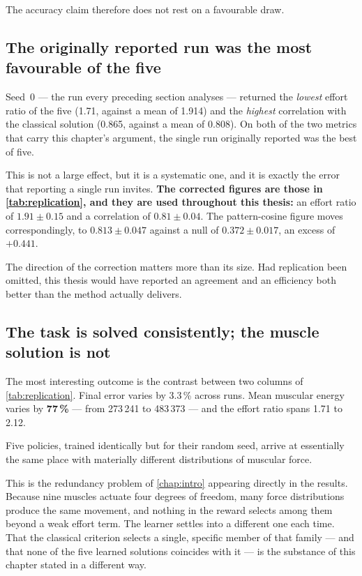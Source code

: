 The accuracy claim therefore does not rest on a favourable draw.

\subsection{The originally reported run was the most favourable of the five}

Seed~0 --- the run every preceding section analyses --- returned the
\emph{lowest} effort ratio of the five (1.71, against a mean of 1.914) and the
\emph{highest} correlation with the classical solution (0.865, against a mean of
0.808). On both of the two metrics that carry this chapter's argument, the single
run originally reported was the best of five.

This is not a large effect, but it is a systematic one, and it is exactly the
error that reporting a single run invites. \textbf{The corrected figures are
those in \cref{tab:replication}, and they are used throughout this thesis:} an
effort ratio of $1.91 \pm 0.15$ and a correlation of $0.81 \pm 0.04$. The
pattern-cosine figure moves correspondingly, to $0.813 \pm 0.047$ against a null
of $0.372 \pm 0.017$, an excess of $+0.441$.

The direction of the correction matters more than its size. Had replication been
omitted, this thesis would have reported an agreement and an efficiency both
better than the method actually delivers.

\subsection{The task is solved consistently; the muscle solution is not}

The most interesting outcome is the contrast between two columns of
\cref{tab:replication}. Final error varies by 3.3\,\% across runs. Mean muscular
energy varies by \textbf{77\,\%} --- from 273\,241 to 483\,373 --- and the effort
ratio spans 1.71 to 2.12.

Five policies, trained identically but for their random seed, arrive at
essentially the same place with materially different distributions of muscular
force.

This is the redundancy problem of \cref{chap:intro} appearing directly in the
results. Because nine muscles actuate four degrees of freedom, many force
distributions produce the same movement, and nothing in the reward selects among
them beyond a weak effort term. The learner settles into a different one each
time. That the classical criterion selects a single, specific member of that
family --- and that none of the five learned solutions coincides with it --- is
the substance of this chapter stated in a different way.

